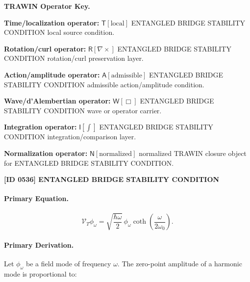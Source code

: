 \par\vspace{0.45\baselineskip}
\noindent\begin{minipage}[t]{\linewidth}
\begingroup
\small
\raggedright
\textbf{TRAWIN Operator Key.}\par
\noindent\textbf{Time/localization operator:} $\mathsf{T}\!\left[\mathrm{local}\right]$ ENTANGLED BRIDGE STABILITY CONDITION local source condition.\par
\noindent\textbf{Rotation/curl operator:} $\mathsf{R}\!\left[\nabla\times\right]$ ENTANGLED BRIDGE STABILITY CONDITION rotation/curl preservation layer.\par
\noindent\textbf{Action/amplitude operator:} $\mathsf{A}\!\left[\mathrm{admissible}\right]$ ENTANGLED BRIDGE STABILITY CONDITION admissible action/amplitude condition.\par
\noindent\textbf{Wave/d'Alembertian operator:} $\mathsf{W}\!\left[\Box\right]$ ENTANGLED BRIDGE STABILITY CONDITION wave or operator carrier.\par
\noindent\textbf{Integration operator:} $\mathsf{I}\!\left[\int\right]$ ENTANGLED BRIDGE STABILITY CONDITION integration/comparison layer.\par
\noindent\textbf{Normalization operator:} $\mathsf{N}\!\left[\mathrm{normalized}\right]$ normalized TRAWIN closure object for ENTANGLED BRIDGE STABILITY CONDITION.\par
\endgroup
\end{minipage}

\clearpage
\noindent\textbf{[ID 0536] ENTANGLED BRIDGE STABILITY CONDITION}\par
\vspace{0.35em}
\begingroup\small
\paragraph{Primary Equation.}
\begin{equation}
\mathcal{V}_T\phi_{\omega}
=
\sqrt{
\frac{\hbar\omega}{2}
}
\,\phi_{\omega}
\coth\left(
\frac{\omega}{2\omega_0}
\right).
\end{equation}

\paragraph{Primary Derivation.}
Let $\phi_{\omega}$ be a field mode of frequency $\omega$.  
The zero-point amplitude of a harmonic mode is proportional to:

